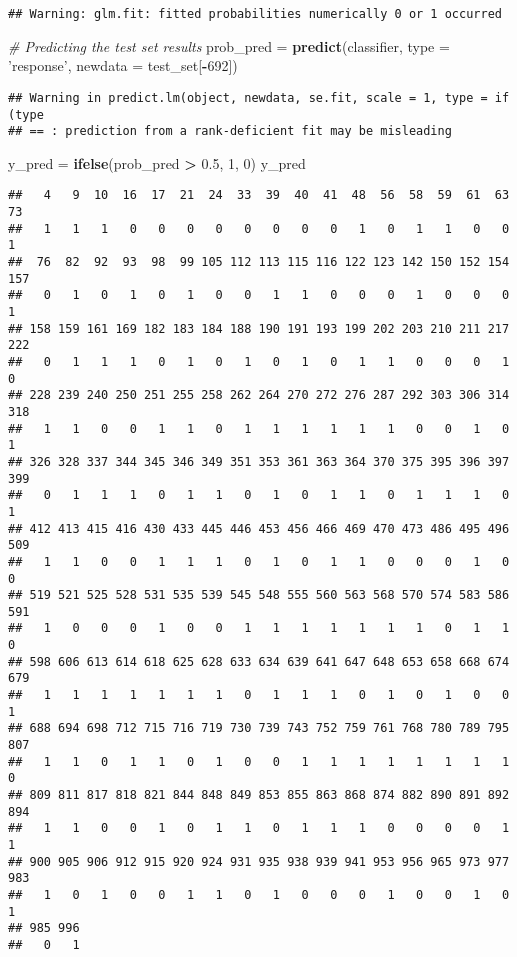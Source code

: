 \documentclass[]{article}
\newenvironment{Shaded}{\begin{snugshade}}{\end{snugshade}}
\newcommand{\CommentTok}[1]{\textcolor[rgb]{0.56,0.35,0.01}{\textit{#1}}}
\newcommand{\DataTypeTok}[1]{\textcolor[rgb]{0.13,0.29,0.53}{#1}}
\newcommand{\DecValTok}[1]{\textcolor[rgb]{0.00,0.00,0.81}{#1}}
\newcommand{\FloatTok}[1]{\textcolor[rgb]{0.00,0.00,0.81}{#1}}
\newcommand{\KeywordTok}[1]{\textcolor[rgb]{0.13,0.29,0.53}{\textbf{#1}}}
\newcommand{\NormalTok}[1]{#1}
\newcommand{\OperatorTok}[1]{\textcolor[rgb]{0.81,0.36,0.00}{\textbf{#1}}}
\newcommand{\StringTok}[1]{\textcolor[rgb]{0.31,0.60,0.02}{#1}}
\begin{document}
\begin{verbatim}
## Warning: glm.fit: fitted probabilities numerically 0 or 1 occurred
\end{verbatim}

\begin{Shaded}
\begin{Highlighting}[]
\CommentTok{# Predicting the test set results}
\NormalTok{prob_pred =}\StringTok{ }\KeywordTok{predict}\NormalTok{(classifier, }\DataTypeTok{type =} \StringTok{'response'}\NormalTok{, }\DataTypeTok{newdata =}\NormalTok{ test_set[}\OperatorTok{-}\DecValTok{692}\NormalTok{])}
\end{Highlighting}
\end{Shaded}

\begin{verbatim}
## Warning in predict.lm(object, newdata, se.fit, scale = 1, type = if (type
## == : prediction from a rank-deficient fit may be misleading
\end{verbatim}

\begin{Shaded}
\begin{Highlighting}[]
\NormalTok{y_pred =}\StringTok{ }\KeywordTok{ifelse}\NormalTok{(prob_pred }\OperatorTok{>}\StringTok{ }\FloatTok{0.5}\NormalTok{, }\DecValTok{1}\NormalTok{, }\DecValTok{0}\NormalTok{)}
\NormalTok{y_pred}
\end{Highlighting}
\end{Shaded}

\begin{verbatim}
##   4   9  10  16  17  21  24  33  39  40  41  48  56  58  59  61  63  73 
##   1   1   1   0   0   0   0   0   0   0   0   1   0   1   1   0   0   1 
##  76  82  92  93  98  99 105 112 113 115 116 122 123 142 150 152 154 157 
##   0   1   0   1   0   1   0   0   1   1   0   0   0   1   0   0   0   1 
## 158 159 161 169 182 183 184 188 190 191 193 199 202 203 210 211 217 222 
##   0   1   1   1   0   1   0   1   0   1   0   1   1   0   0   0   1   0 
## 228 239 240 250 251 255 258 262 264 270 272 276 287 292 303 306 314 318 
##   1   1   0   0   1   1   0   1   1   1   1   1   1   0   0   1   0   1 
## 326 328 337 344 345 346 349 351 353 361 363 364 370 375 395 396 397 399 
##   0   1   1   1   0   1   1   0   1   0   1   1   0   1   1   1   0   1 
## 412 413 415 416 430 433 445 446 453 456 466 469 470 473 486 495 496 509 
##   1   1   0   0   1   1   1   0   1   0   1   1   0   0   0   1   0   0 
## 519 521 525 528 531 535 539 545 548 555 560 563 568 570 574 583 586 591 
##   1   0   0   0   1   0   0   1   1   1   1   1   1   1   0   1   1   0 
## 598 606 613 614 618 625 628 633 634 639 641 647 648 653 658 668 674 679 
##   1   1   1   1   1   1   1   0   1   1   1   0   1   0   1   0   0   1 
## 688 694 698 712 715 716 719 730 739 743 752 759 761 768 780 789 795 807 
##   1   1   0   1   1   0   1   0   0   1   1   1   1   1   1   1   1   0 
## 809 811 817 818 821 844 848 849 853 855 863 868 874 882 890 891 892 894 
##   1   1   0   0   1   0   1   1   0   1   1   1   0   0   0   0   1   1 
## 900 905 906 912 915 920 924 931 935 938 939 941 953 956 965 973 977 983 
##   1   0   1   0   0   1   1   0   1   0   0   0   1   0   0   1   0   1 
## 985 996 
##   0   1
\end{verbatim}
\end{document}
